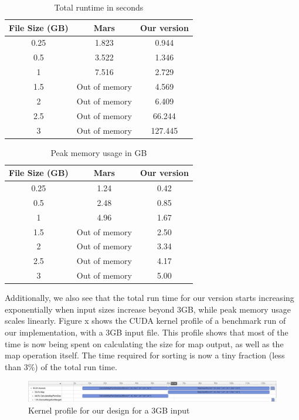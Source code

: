 \documentclass{article}
\begin{document}
\begin{table}[h!]
\centering
\begin{tabular}{|c|c|c|} 
 \hline
 File Size (GB) & Mars & Our version\\  
 \hline
 0.25 &  1.823 & 0.944  \\ 
 0.5 & 3.522 & 1.346  \\
 1 & 7.516 & 2.729  \\
 1.5 & Out of memory & 4.569 \\
 2 & Out of memory & 6.409 \\
 2.5 & Out of memory & 66.244 \\
 3 & Out of memory & 127.445 \\ 
\hline
\end{tabular}
\caption{Total runtime in seconds}
\label{table:total-runtime}
\end{table}

\begin{table}[h!]
\centering
\begin{tabular}{|c|c|c|} 
 \hline
 File Size (GB) & Mars & Our version\\  
 \hline
 0.25 &  1.24 & 0.42  \\ 
 0.5 & 2.48 & 0.85  \\
 1 & 4.96 & 1.67  \\
 1.5 & Out of memory & 2.50 \\
 2 & Out of memory & 3.34 \\
 2.5 & Out of memory & 4.17 \\
 3 & Out of memory & 5.00 \\ 
\hline
\end{tabular}
\caption{Peak memory usage in GB}
\label{table:peak-memory-use}
\end{table}

Additionally, we also see that the total run time for our version starts increasing exponentially when input sizes increase beyond 3GB, while peak memory usage scales linearly. Figure x shows the CUDA kernel profile of a benchmark run of our implementation, with a 3GB input file. This profile shows that most of the time is now being spent on calculating the size for map output, as well as the map operation itself. The time required for sorting is now a tiny fraction (less than 3\%) of the total run time. 

\begin{figure}[h]
    \centering
    \includegraphics[width=1\linewidth]{images/mr-kernels-3gb.png}
    \caption{Kernel profile for our design for a 3GB input}
    \label{fig:mr-kernels-3gb}
\end{figure}
\end{document}
